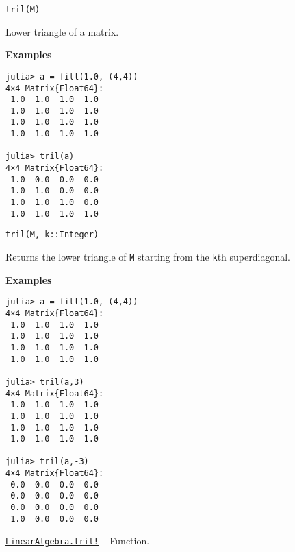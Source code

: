 \begin{adjustwidth}{2em}{0pt}


\begin{verbatim}
tril(M)
\end{verbatim}

Lower triangle of a matrix.

\textbf{Examples}


\begin{verbatim}
julia> a = fill(1.0, (4,4))
4×4 Matrix{Float64}:
 1.0  1.0  1.0  1.0
 1.0  1.0  1.0  1.0
 1.0  1.0  1.0  1.0
 1.0  1.0  1.0  1.0

julia> tril(a)
4×4 Matrix{Float64}:
 1.0  0.0  0.0  0.0
 1.0  1.0  0.0  0.0
 1.0  1.0  1.0  0.0
 1.0  1.0  1.0  1.0
\end{verbatim}




\begin{lstlisting}
tril(M, k::Integer)
\end{lstlisting}

Returns the lower triangle of \texttt{M} starting from the \texttt{k}th superdiagonal.

\textbf{Examples}


\begin{verbatim}
julia> a = fill(1.0, (4,4))
4×4 Matrix{Float64}:
 1.0  1.0  1.0  1.0
 1.0  1.0  1.0  1.0
 1.0  1.0  1.0  1.0
 1.0  1.0  1.0  1.0

julia> tril(a,3)
4×4 Matrix{Float64}:
 1.0  1.0  1.0  1.0
 1.0  1.0  1.0  1.0
 1.0  1.0  1.0  1.0
 1.0  1.0  1.0  1.0

julia> tril(a,-3)
4×4 Matrix{Float64}:
 0.0  0.0  0.0  0.0
 0.0  0.0  0.0  0.0
 0.0  0.0  0.0  0.0
 1.0  0.0  0.0  0.0
\end{verbatim}



\end{adjustwidth}
\hypertarget{579033117422555588}{}
\hyperlink{579033117422555588}{\texttt{LinearAlgebra.tril!}}  -- {Function.}

